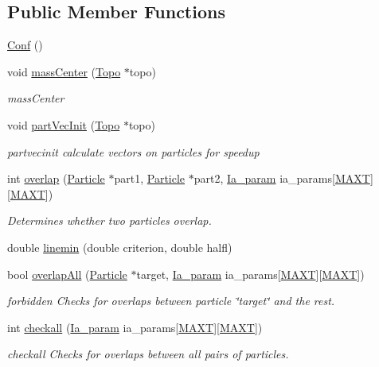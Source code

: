 \subsection*{Public Member Functions}
\begin{DoxyCompactItemize}
\item 
\hyperlink{class_conf_a143db233420f3d2ad3863c5320d6796d}{Conf} ()
\item 
void \hyperlink{class_conf_a4f70f2b18865d894c00fa0138247e32f}{mass\+Center} (\hyperlink{struct_topo}{Topo} $\ast$topo)
\begin{DoxyCompactList}\small\item\em mass\+Center \end{DoxyCompactList}\item 
void \hyperlink{class_conf_ad1b87bd14eb659a88c59668c78b6bf02}{part\+Vec\+Init} (\hyperlink{struct_topo}{Topo} $\ast$topo)
\begin{DoxyCompactList}\small\item\em partvecinit calculate vectors on particles for speedup \end{DoxyCompactList}\item 
int \hyperlink{class_conf_a5e8333ea6a4c8d4ef64f1b675aa61c66}{overlap} (\hyperlink{class_particle}{Particle} $\ast$part1, \hyperlink{class_particle}{Particle} $\ast$part2, \hyperlink{struct_ia__param}{Ia\+\_\+param} ia\+\_\+params\mbox{[}\hyperlink{macros_8h_a3f79fdecc884eb98c97d1bdc77455295}{M\+A\+X\+T}\mbox{]}\mbox{[}\hyperlink{macros_8h_a3f79fdecc884eb98c97d1bdc77455295}{M\+A\+X\+T}\mbox{]})
\begin{DoxyCompactList}\small\item\em Determines whether two particles overlap. \end{DoxyCompactList}\item 
double \hyperlink{class_conf_a6e0faf2e313a9b5029d09b1d03523132}{linemin} (double criterion, double halfl)
\item 
bool \hyperlink{class_conf_a70be9b800e58ca0b8a70d8d82bb865b8}{overlap\+All} (\hyperlink{class_particle}{Particle} $\ast$target, \hyperlink{struct_ia__param}{Ia\+\_\+param} ia\+\_\+params\mbox{[}\hyperlink{macros_8h_a3f79fdecc884eb98c97d1bdc77455295}{M\+A\+X\+T}\mbox{]}\mbox{[}\hyperlink{macros_8h_a3f79fdecc884eb98c97d1bdc77455295}{M\+A\+X\+T}\mbox{]})
\begin{DoxyCompactList}\small\item\em forbidden Checks for overlaps between particle \char`\"{}target\char`\"{} and the rest. \end{DoxyCompactList}\item 
int \hyperlink{class_conf_ad9286a65f6233e0f25b14a84e23e58b7}{checkall} (\hyperlink{struct_ia__param}{Ia\+\_\+param} ia\+\_\+params\mbox{[}\hyperlink{macros_8h_a3f79fdecc884eb98c97d1bdc77455295}{M\+A\+X\+T}\mbox{]}\mbox{[}\hyperlink{macros_8h_a3f79fdecc884eb98c97d1bdc77455295}{M\+A\+X\+T}\mbox{]})
\begin{DoxyCompactList}\small\item\em checkall Checks for overlaps between all pairs of particles. \end{DoxyCompactList}\end{DoxyCompactItemize}
